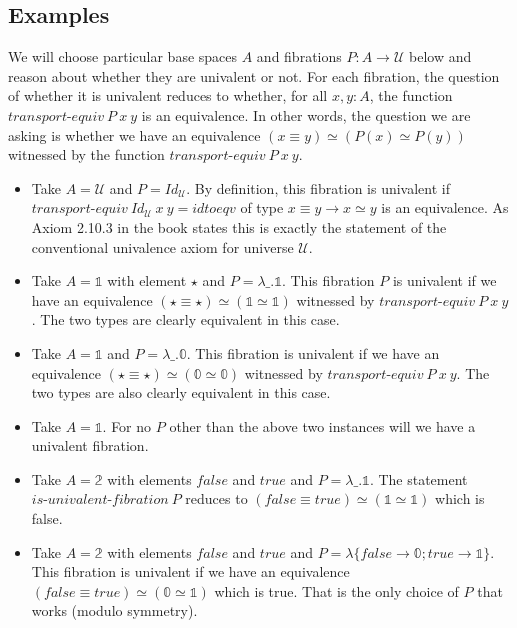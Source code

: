 \documentclass{entcs}
\newcommand{\zt}{\mathbb{0}}
\newcommand{\ot}{\mathbb{1}}
\newcommand{\bt}{\mathbb{2}}
\newcommand{\fc}{\mathit{false}}
\newcommand{\tc}{\mathit{true}}
\begin{document}
\subsection{Examples}

We will choose particular base spaces $A$ and fibrations $P : A \to \mathcal{U}$
below and reason about whether they are univalent or not. For each fibration,
the question of whether it is univalent reduces to whether, for all $x,y:A$, the
function $\textit{transport-equiv}~P~x~y$ is an equivalence. In other words, the
question we are asking is whether we have an equivalence
$(x \equiv y) \simeq (P(x) \simeq P(y))$ witnessed by the function
$\textit{transport-equiv}~P~x~y$.

\begin{itemize}

\item Take $A = \mathcal{U}$ and $P = \mathit{Id}_{\mathcal{U}}$. By definition,
  this fibration is univalent if
  $\textit{transport-equiv}~\mathit{Id}_{\mathcal{U}}~x~y = \mathit{idtoeqv}$ of
    type $x \equiv y \to x \simeq y$ is an equivalence. As Axiom 2.10.3 in the
    book states this is exactly the statement of the conventional univalence
    axiom for universe $\mathcal{U}$.

\item Take $A = \ot$ with element $\star$ and $P = \lambda \_. \ot$. This
    fibration $P$ is univalent if we have an equivalence
    $(\star\equiv\star) \simeq (\ot\simeq\ot)$ witnessed by
    $\textit{transport-equiv}~P~x~y$. The two types are clearly equivalent in
    this case.

\item Take $A = \ot$ and $P = \lambda \_. \zt$. This fibration is univalent if
    we have an equivalence $(\star\equiv\star)\simeq(\zt\simeq\zt)$ witnessed by
    $\textit{transport-equiv}~P~x~y$. The two types are also clearly equivalent
    in this case.

\item Take $A = \ot$. For no $P$ other than the above two instances will we
    have a univalent fibration.

\item Take $A = \bt$ with elements $\fc$ and $\tc$ and
  $P = \lambda \_. \ot$. The statement
  $\textit{is-univalent-fibration}~P$ reduces to $(\fc \equiv \tc) \simeq
  (\ot\simeq\ot)$ which is false.

\item Take $A = \bt$ with elements $\fc$ and $\tc$ and
  $P = \lambda \{ \fc \to \zt; \tc \to \ot \}$. This fibration is univalent if
  we have an equivalence $(\fc \equiv \tc) \simeq (\zt\simeq\ot)$ which is
  true. That is the only choice of $P$ that works (modulo symmetry).


\end{itemize}
\end{document}
